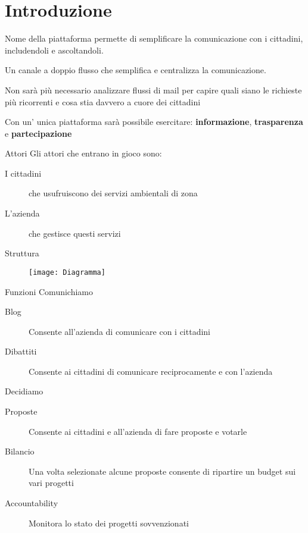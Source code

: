 \section{Introduzione}
\begin{frame}{}

  Nome della piattaforma permette di semplificare la comunicazione con i cittadini, includendoli e ascoltandoli.
  \pause
  \bigskip

  Un canale a doppio flusso che semplifica e centralizza la comunicazione.
  \pause

\end{frame}
\begin{frame}
  Non sarà più necessario analizzare flussi di mail per capire quali siano le richieste più ricorrenti e cosa stia davvero a cuore dei cittadini
  \pause

  Con un' unica piattaforma sarà possibile esercitare:
  \textbf{informazione},  \textbf{trasparenza} e  \textbf{partecipazione}
\end{frame}
\begin{frame}{Attori}
  Gli attori che entrano in gioco sono:
  \begin{description}
    \item[I cittadini] che usufruiscono dei servizi ambientali di zona
    \item[L'azienda] che gestisce questi servizi
  \end{description}


\end{frame}

\begin{frame}{Struttura}

  \begin{figure}

    \texttt{[image: Diagramma]}
  \end{figure}

\end{frame}
\begin{frame}{Funzioni}
  Comunichiamo
  \begin{description}
    \item[Blog] Consente all'azienda di comunicare con i cittadini
    \item[Dibattiti] Consente ai cittadini di comunicare reciprocamente e con l'azienda
  \end{description}
  Decidiamo

  \begin{description}
    \item[Proposte] Consente ai cittadini e all'azienda di fare proposte e votarle
    \item[Bilancio] Una volta selezionate alcune proposte consente di ripartire un budget sui vari progetti
    \item[Accountability] Monitora lo stato dei progetti sovvenzionati
  \end{description}
\end{frame}
